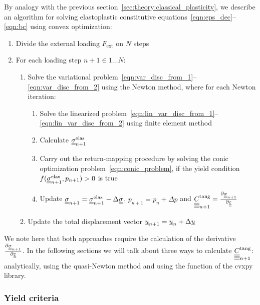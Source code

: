 \documentclass[12pt]{article}
\begin{document}
By analogy with the previous section~\ref{sec:theory:classical_plasticity}, we describe an algorithm for solving elastoplastic constitutive equations~\eqref{eqn:eps_dec}--\eqref{eqn:bc} using convex optimization:
\begin{enumerate}
    \item Divide the external loading $F_\text{ext}$ on $N$ steps
    \item For each loading step $n+1 \in {1 \dots N}$:
    \begin{enumerate}
        \item Solve the variational problem~\eqref{eqn:var_disc_from_1}--\eqref{eqn:var_disc_from_2} using the Newton method, where for each Newton iteration:
        \begin{enumerate}
            \item Solve the linearized problem~\eqref{eqn:lin_var_disc_from_1}--\eqref{eqn:lin_var_disc_from_2} using finite element method
            \item Calculate $\underline{\underline{\sigma}}_{n+1}^{\text{elas}}$ 
            \item Carry out the return-mapping procedure by solving the conic optimization problem~\eqref{eqn:conic_problem}, if the yield condition $f(\underline{\underline{\sigma}}_{n+1}^{\text{elas}}, p_{n+1}) > 0$ is true
            \item Update $\underline{\underline{\sigma}}_{n+1} = \underline{\underline{\sigma}}_{n+1}^{\text{elas}} - \Delta\underline{\underline{\sigma}}$, $p_{n+1} = p_n + \Delta p$ and $\underline{\underline{\underline{\underline{C_{}}}}}^\text{tang}_{n+1} = \frac{\partial \underline{\underline{\sigma}}_{n+1}}{\partial\underline{\underline{\varepsilon}}}$
        \end{enumerate}
        \item Update the total displacement vector $\underline{u}_{n+1} = \underline{u}_n + \Delta\underline{u}$
    \end{enumerate}
\end{enumerate}

We note here that both approaches require the calculation of the derivative $\frac{\partial\underline{\underline{\sigma}}_{n+1}}{\partial\underline{\underline{\varepsilon}}}$. In the following sections we will talk about three ways to calculate $\underline{\underline{\underline{\underline{C_{}}}}}^\text{tang}_{n+1}$: analytically, using the quasi-Newton method and using the  function of the cvxpy library.

\subsubsection{Yield criteria}
\end{document}
